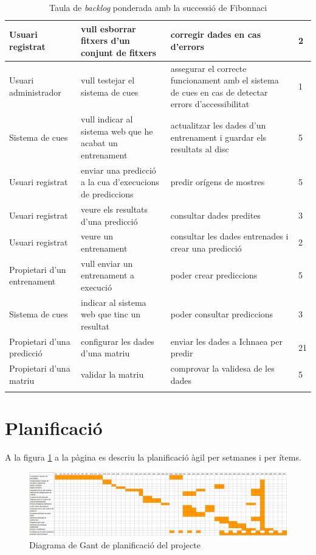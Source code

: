 \begin{center}
\begin{longtable}{ | p{3cm} | p{5cm} | p{5cm} | p{1cm} | }
Usuari registrat & vull esborrar fitxers d'un conjunt de fitxers & corregir dades en cas d'errors & 2 \\ \hline
Usuari administrador & vull testejar el sistema de cues & assegurar el correcte funcionament amb el sistema de cues en cas de detectar errors d'accessibilitat & 1 \\ \hline
Sistema de cues & vull indicar al sistema web que he acabat un entrenament & actualitzar les dades d'un entrenament i guardar els resultats al disc & 5 \\ \hline
Usuari registrat & enviar una predicció a la cua d'execucions de prediccions & predir orígens de mostres & 5  \\ \hline
Usuari registrat & veure els resultats d'una predicció & consultar dades predites & 3  \\ \hline
Usuari registrat & veure un entrenament & consultar les dades entrenades i crear una predicció & 2  \\ \hline
Propietari d'un entrenament & vull enviar un entrenament a execució & poder crear prediccions & 5  \\ \hline
Sistema de cues & indicar al sistema web que tinc un resultat & poder consultar prediccions & 3  \\ \hline
Propietari d'una predicció & configurar les dades d'una matriu	& enviar les dades a Ichnaea per predir & 21  \\ \hline
Propietari d'una matriu & validar la matriu	 & comprovar la validesa de les dades & 5  \\ \hline
\caption{Taula de \textit{backlog} ponderada amb la successió de Fibonnaci}
\label{table:backlog}
\end{longtable}
\end{center}

\section{Planificació}
A la figura \ref{fig:gant} a la p\`{a}gina \pageref{fig:gant} es descriu la planificació àgil per setmanes i per ítems.\\
\begin{figure}
    \includegraphics[scale=0.5]{img/conclussions/gantz.png}
    \caption{Diagrama de Gant de planificació del projecte}
    \label{fig:gant}
\end{figure}

